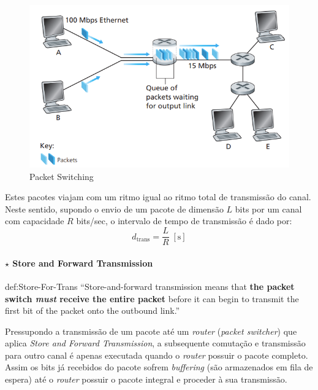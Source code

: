 \renewcommand*{\thefootnote}{\fnsymbol{footnote}}
\renewcommand*{\thefootnote}{\arabic{footnote}}

\vspace{-1em}
\begin{figure}[H]
    \centering
    \includegraphics[width = 0.8\linewidth]{img/1/packet-switching.png}
    \caption{Packet Switching}
    \label{fig:PacketSwitching}
\end{figure}

\noindent Estes pacotes viajam com um ritmo igual ao ritmo total de transmissão do canal. Neste sentido, supondo o envio de um pacote de dimensão $L$ bits por um canal com capacidade $R$ bits/sec, o intervalo de tempo de transmissão é dado por:
$$
   \boxed{d_{\text{trans}} = \dfrac{L}{R}\; [\text{s}]}
$$
\paragraph[1.2.2.1 Store and Forward Transmission]{$\pmb{\star}$ Store and Forward Transmission}\mbox{}

\begin{theo}{def:Store-For-Trans}\label{def:Store-For-Trans}
    ``Store-and-forward transmission means that \textbf{the packet switch \textit{must} receive the entire packet} before it can begin to transmit the first bit of the packet onto the outbound link.''\cite{Kurose2017}
\end{theo}
Pressupondo a transmissão de um pacote até um \textit{router} (\textit{packet switcher}) que aplica \textit{Store and Forward Transmission}, a subsequente comutação e transmissão para outro canal é apenas executada quando o \textit{router} possuir o pacote completo. Assim os bits já recebidos do pacote sofrem \textit{buffering} (são armazenados em fila de espera) até o \textit{router} possuir o pacote integral e proceder à sua transmissão.

